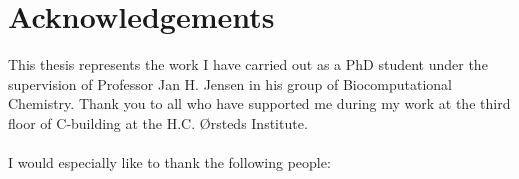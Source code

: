 \chapter*{Acknowledgements}

This thesis represents the work I have carried out as a PhD student under the supervision of Professor Jan H. Jensen in his group of Biocomputational Chemistry.
Thank you to all who have supported me during my work at the third floor of C-building at the H.C. Ørsteds Institute.
\\\\I would especially like to thank the following people:

